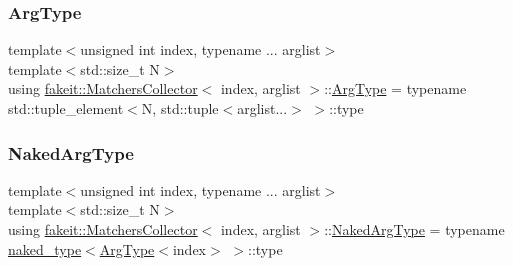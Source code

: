 \subsubsection{\texorpdfstring{ArgType}{ArgType}\hspace{0.1cm}{\footnotesize\ttfamily [9/9]}}
{\footnotesize\ttfamily template$<$unsigned int index, typename ... arglist$>$ \\
template$<$std\+::size\+\_\+t N$>$ \\
using \mbox{\hyperlink{classfakeit_1_1MatchersCollector}{fakeit\+::\+Matchers\+Collector}}$<$ index, arglist $>$\+::\mbox{\hyperlink{classfakeit_1_1MatchersCollector_aaba0fca8c182a698dda8ca056c29fe5f}{Arg\+Type}} =  typename std\+::tuple\+\_\+element$<$N, std\+::tuple$<$arglist...$>$ $>$\+::type}

\mbox{\label{classfakeit_1_1MatchersCollector_aeda8ced6a2f0cb7c6e4f916f18a91730}} 
\subsubsection{\texorpdfstring{NakedArgType}{NakedArgType}\hspace{0.1cm}{\footnotesize\ttfamily [1/9]}}
{\footnotesize\ttfamily template$<$unsigned int index, typename ... arglist$>$ \\
template$<$std\+::size\+\_\+t N$>$ \\
using \mbox{\hyperlink{classfakeit_1_1MatchersCollector}{fakeit\+::\+Matchers\+Collector}}$<$ index, arglist $>$\+::\mbox{\hyperlink{classfakeit_1_1MatchersCollector_aeda8ced6a2f0cb7c6e4f916f18a91730}{Naked\+Arg\+Type}} =  typename \mbox{\hyperlink{structfakeit_1_1naked__type}{naked\+\_\+type}}$<$\mbox{\hyperlink{classfakeit_1_1MatchersCollector_aaba0fca8c182a698dda8ca056c29fe5f}{Arg\+Type}}$<$index$>$ $>$\+::type}

\mbox{\label{classfakeit_1_1MatchersCollector_aeda8ced6a2f0cb7c6e4f916f18a91730}} 
